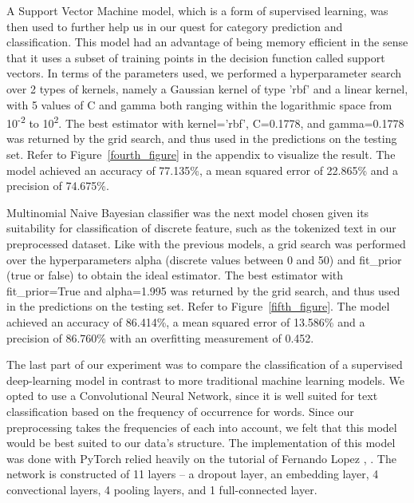 \documentclass[10pt,twocolumn,letterpaper]{article}
\begin{document}
A Support Vector Machine model, which is a form of supervised learning, was then used to further help us in our quest for category prediction and classification. This model had an advantage of being memory efficient in the sense that it uses a subset of training points in the decision function called support vectors. In terms of the parameters used, we performed a hyperparameter search over 2 types of kernels, namely a Gaussian kernel of type 'rbf' and a linear kernel, with 5 values of C and gamma both ranging within the logarithmic space from 10\textsuperscript{-2} to 10\textsuperscript{2}. The best estimator with kernel='rbf', C=0.1778, and gamma=0.1778 was returned by the grid search, and thus used in the predictions on the testing set. Refer to Figure~\ref{fourth_figure} in the appendix to visualize the result. The model achieved an accuracy of 77.135\%, a mean squared error of 22.865\% and a precision of 74.675\%.\par

Multinomial Naive Bayesian classifier was the next model chosen given its suitability for classification of discrete feature, such as the tokenized text in our preprocessed dataset. Like with the previous models, a grid search was performed over the hyperparameters alpha (discrete values between 0 and 50) and fit\_prior (true or false) to obtain the ideal estimator. The best estimator with fit\_prior=True and alpha=1.995 was returned by the grid search, and thus used in the predictions on the testing set. Refer to Figure~\ref{fifth_figure}. The model achieved an accuracy of 86.414\%, a mean squared error of 13.586\% and a precision of 86.760\% with an overfitting measurement of 0.452. \par

The last part of our experiment was to compare the classification of a supervised deep-learning model in contrast to more traditional machine learning models. We opted to use a Convolutional Neural Network, since it is well suited for text classification based on the frequency of occurrence for words. Since our preprocessing takes the frequencies of each into account, we felt that this model would be best suited to our data's structure. The implementation of this model was done with PyTorch relied heavily on the tutorial of Fernando Lopez \cite{Fernando}, \cite{githubFer}. The network is constructed of 11 layers – a dropout layer, an embedding layer, 4 convectional layers, 4 pooling layers, and 1 full-connected layer. \par
\end{document}

